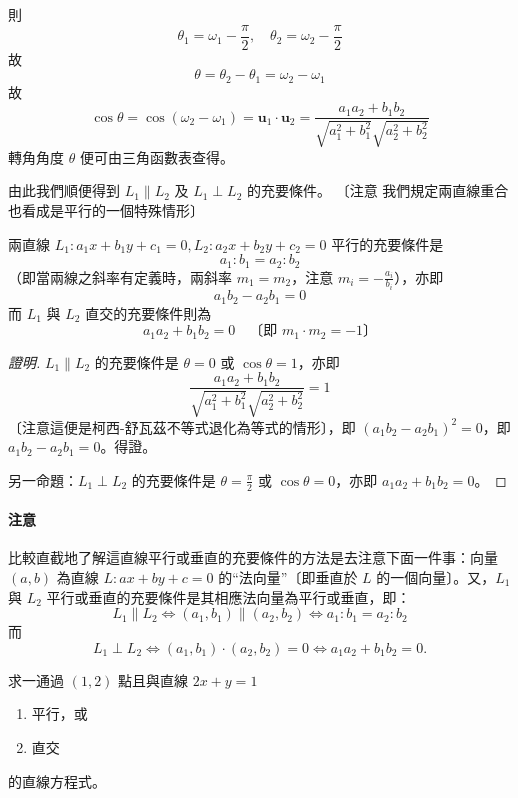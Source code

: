 則
\[ \theta_1 = \omega_1 - \frac{\pi}{2}, \quad \theta_2 = \omega_2 - \frac{\pi}{2} \]
故
\[ \theta = \theta_2 - \theta_1 = \omega_2 - \omega_1 \]
故
\[ \cos\theta = \cos(\omega_2 - \omega_1) = \mathbf{u}_1\cdot\mathbf{u}_2 = \frac{a_1 a_2 + b_1 b_2}{\sqrt{a_1^2 + b_1^2}\sqrt{a_2^2 + b_2^2}} \]
轉角角度 $\theta$ 便可由三角函數表查得。

由此我們順便得到 $L_1 \parallel L_2$ 及 $L_1 \perp L_2$ 的充要條件。
〔注意 我們規定兩直線重合也看成是平行的一個特殊情形〕

\begin{proposition}
\label{prop:b3s-4-1}
兩直線 $L_1 : a_1 x + b_1 y + c_1 = 0, L_2 : a_2 x + b_2 y + c_2 = 0$ 平行的充要條件是
\begin{equation}
a_1 : b_1 = a_2 : b_2
\label{eq:b3s-4-19}
\end{equation}
（即當兩線之斜率有定義時，兩斜率 $m_1 = m_2$，注意 $m_i = -\frac{a_i}{b_i}$），亦即
\[ a_1 b_2 - a_2 b_1 = 0 \]
而 $L_1$ 與 $L_2$ 直交的充要條件則為
\begin{equation}
a_1 a_2 + b_1 b_2 = 0 \quad\text{〔即 $m_1 \cdot m_2 = -1$〕}
\label{eq:b3s-4-20}
\end{equation}
\end{proposition}

\begin{proof}[證明]
$L_1 \parallel L_2$ 的充要條件是 $\theta = 0$ 或 $\cos\theta = 1$，亦即
\[ \frac{a_1 a_2 + b_1 b_2}{\sqrt{a_1^2 + b_1^2}\sqrt{a_2^2 + b_2^2}} = 1 \]
〔注意這便是柯西-舒瓦茲不等式退化為等式的情形〕，即 $(a_1 b_2 - a_2 b_1)^2 = 0$，即 $a_1 b_2 - a_2 b_1 = 0$。得證。

另一命題：$L_1 \perp L_2$ 的充要條件是 $\theta = \frac{\pi}{2}$ 或 $\cos\theta = 0$，亦即 $a_1 a_2 + b_1 b_2 = 0$。
\end{proof}

\paragraph*{注意}
比較直截地了解這直線平行或垂直的充要條件的方法是去注意下面一件事：向量 $(a, b)$ 為直線 $L : ax + by + c = 0$ 的“法向量”〔即垂直於 $L$ 的一個向量〕。又，$L_1$ 與 $L_2$ 平行或垂直的充要條件是其相應法向量為平行或垂直，即：
\[ L_1 \parallel L_2 \iff (a_1, b_1) \parallel (a_2, b_2) \iff a_1 : b_1 = a_2 : b_2 \]
而
\[ L_1 \perp L_2 \iff (a_1, b_1)\cdot(a_2, b_2) = 0 \iff a_1 a_2 + b_1 b_2 = 0. \]

\begin{example}[例 15]
求一通過 $(1, 2)$ 點且與直線 $2x + y = 1$
\begin{enumerate}[label=(\roman*), leftmargin=2em]
  \item 平行，或
  \item 直交
\end{enumerate}
的直線方程式。
\end{example}

